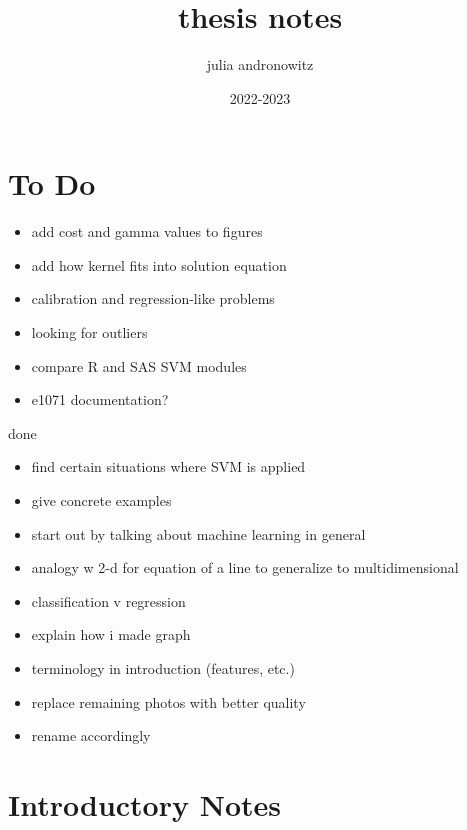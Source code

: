 \documentclass{article}
\title{thesis notes}
\author{julia andronowitz }
\date{2022-2023}
\begin{document}
\maketitle

\section{To Do}

\begin{itemize}
    \item add cost and gamma values to figures
    \item add how kernel fits into solution equation
    \item calibration and regression-like problems
    \item looking for outliers
    \item compare R and SAS SVM modules
    \item e1071 documentation?
\end{itemize}

done
\begin{itemize}
    \item find certain situations where SVM is applied
    \item give concrete examples
    \item start out by talking about machine learning in general
    \item analogy w 2-d for equation of a line to generalize to multidimensional
    \item classification v regression
    \item explain how i made graph
    \item terminology in introduction (features, etc.)
    \item replace remaining photos with better quality
    \item rename accordingly
\end{itemize}

\section{Introductory Notes}
\end{document}
